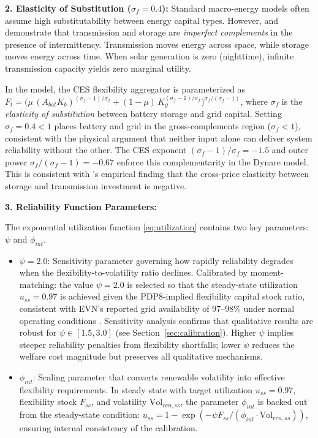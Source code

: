 \documentclass[12pt, a4paper]{article}
\begin{document}
\textbf{2. Elasticity of Substitution ($\sigma_f = 0.4$):}
Standard macro-energy models often assume high substitutability between energy capital types. However, \citet{hart2019} and \citet{hirth2013} demonstrate that transmission and storage are \textit{imperfect complements} in the presence of intermittency. Transmission moves energy across space, while storage moves energy across time. When solar generation is zero (nighttime), infinite transmission capacity yields zero marginal utility.

In the model, the CES flexibility aggregator is parameterized as $F_t = \bigl(\mu\,(A_{bat}K_{b})^{(\sigma_f-1)/\sigma_f} + (1-\mu)\,K_{g}^{(\sigma_f-1)/\sigma_f}\bigr)^{\sigma_f/(\sigma_f-1)}$, where $\sigma_f$ is the \textit{elasticity of substitution} between battery storage and grid capital. Setting $\sigma_f = 0.4 < 1$ places battery and grid in the gross-complements region ($\sigma_f < 1$), consistent with the physical argument that neither input alone can deliver system reliability without the other. The CES exponent $(\sigma_f - 1)/\sigma_f = -1.5$ and outer power $\sigma_f/(\sigma_f-1) = -0.67$ enforce this complementarity in the Dynare model. This is consistent with \citet{hart2019}'s empirical finding that the cross-price elasticity between storage and transmission investment is negative.

\textbf{3. Reliability Function Parameters:}

The exponential utilization function \eqref{eq:utilization} contains two key parameters: $\psi$ and $\phi_{int}$.

\begin{itemize}
    \item $\psi = 2.0$: Sensitivity parameter governing how rapidly reliability degrades when the flexibility-to-volatility ratio declines. Calibrated by moment-matching: the value $\psi = 2.0$ is selected so that the steady-state utilization $u_{ss} = 0.97$ is achieved given the PDP8-implied flexibility capital stock ratio, consistent with EVN's reported grid availability of 97--98\% under normal operating conditions \citep{evn2023}. Sensitivity analysis confirms that qualitative results are robust for $\psi \in [1.5, 3.0]$ (see Section~\ref{sec:calibration}). Higher $\psi$ implies steeper reliability penalties from flexibility shortfalls; lower $\psi$ reduces the welfare cost magnitude but preserves all qualitative mechanisms.
    
    \item $\phi_{int}$: Scaling parameter that converts renewable volatility into effective flexibility requirements. In steady state with target utilization $u_{ss} = 0.97$, flexibility stock $F_{ss}$, and volatility $\text{Vol}_{ren,ss}$, the parameter $\phi_{int}$ is backed out from the steady-state condition: $u_{ss} = 1 - \exp(-\psi F_{ss}/(\phi_{int} \cdot \text{Vol}_{ren,ss}))$, ensuring internal consistency of the calibration.
\end{itemize}
\end{document}
